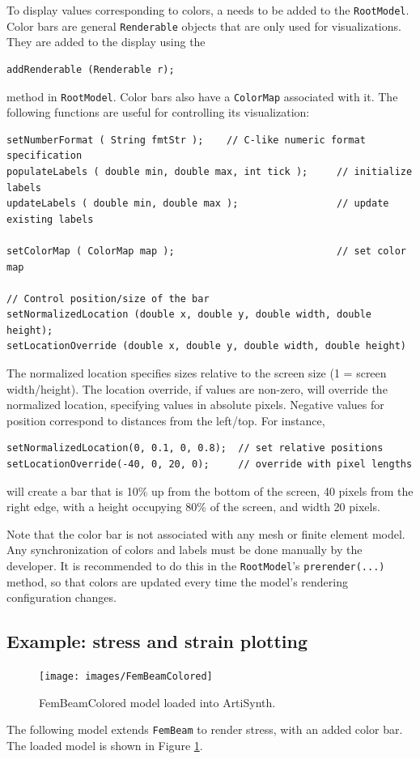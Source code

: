 To display values corresponding to colors, a 
 needs to be added to the 
{\tt RootModel}.  Color bars are general {\tt Renderable} objects that are
only used for visualizations.  They are added to the display using the
\begin{lstlisting}[]
addRenderable (Renderable r);
\end{lstlisting}
method in {\tt RootModel}.  Color bars also have a {\tt ColorMap} associated
with it.  The following functions are useful for controlling its visualization:
\begin{lstlisting}[]
setNumberFormat ( String fmtStr );    // C-like numeric format specification
populateLabels ( double min, double max, int tick );     // initialize labels
updateLabels ( double min, double max );                 // update existing labels

setColorMap ( ColorMap map );                            // set color map

// Control position/size of the bar
setNormalizedLocation (double x, double y, double width, double height);
setLocationOverride (double x, double y, double width, double height)
\end{lstlisting}
The normalized location specifies sizes relative to the screen size 
(1 = screen width/height).  The location override, if values are non-zero,
will override the normalized location, specifying values in absolute pixels.
Negative values for position correspond to distances from the left/top.
For instance,
\begin{lstlisting}[]
setNormalizedLocation(0, 0.1, 0, 0.8);  // set relative positions
setLocationOverride(-40, 0, 20, 0);     // override with pixel lengths
\end{lstlisting}
will create a bar that is 10\% up from the bottom of the screen, 40 pixels from
the right edge, with a height occupying 80\% of the screen, and width 20 pixels.

Note that the color bar is not associated with any mesh or finite element model.
Any synchronization of colors and labels must be done manually by the developer.
It is recommended to do this in the {\tt RootModel}'s {\tt prerender(...)} method,
so that colors are updated every time the model's rendering configuration changes.

\subsection{Example: stress and strain plotting}

\begin{figure}[ht]
	\centering
	\texttt{[image: images/FemBeamColored]}
	\caption{FemBeamColored model loaded into ArtiSynth.}
	\label{fig:fem:beamcolored}
\end{figure}

The following model extends {\tt FemBeam} to render stress, with an added 
color bar.  The loaded model is shown in Figure \ref{fig:fem:beamcolored}.
\lstset{numbers=left}

\lstset{numbers=none}

\ifdefined\maindoc
\else

\fi
